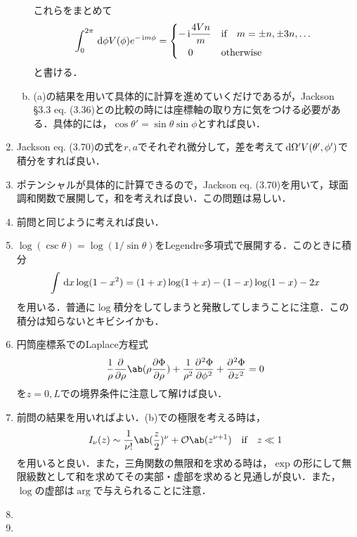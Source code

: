 \begin{enumerate}[label=\fbox{\textbf{\thesection.\arabic*}}]
\begin{enumerate}[(a)]
        これらをまとめて
        \begin{gather}
          \int_0^{2\pi} \dl{\phi} V(\phi) e^{-\i m \phi} = 
          \begin{dcases}
            - \i\frac{4Vn}{m} & \text{if}\qq m = \pm n, \pm 3n, \ldots\\
            \qq 0 &\text{otherwise}
          \end{dcases}
        \end{gather}
        と書ける．
      \item (a)の結果を用いて具体的に計算を進めていくだけであるが，Jackson §3.3 eq. (3.36)との比較の時には座標軸の取り方に気をつける必要がある．具体的には，$\cos\theta' = \sin\theta \sin \phi$とすれば良い．
    \end{enumerate}
  \item Jackson eq. (3.70)の式を$r, a$でそれぞれ微分して，差を考えて$\dl{\Omega'}V(\theta' , \phi')$で積分をすれば良い．
  \item ポテンシャルが具体的に計算できるので，Jackson eq. (3.70)を用いて，球面調和関数で展開して，和を考えれば良い．この問題は易しい．
  \item 前問と同じように考えれば良い．
  \item $\log(\csc\theta) = \log(1/\sin\theta)$をLegendre多項式で展開する．このときに積分
    \begin{gather}
      \int \dl{x} \log(1 - x^2) = (1+x)\log(1+x) - (1-x)\log(1-x) - 2x
    \end{gather}
    を用いる．普通に$\log$積分をしてしまうと発散してしまうことに注意．この積分は知らないとキビシイかも．
  \item 円筒座標系でのLaplace方程式
    \begin{gather}
      \frac{1}{\rho}\diffp**{\rho}{\ab(\rho \diffp{\Phi}{\rho})} + \frac{1}{\rho^2}\diffp[2]{\Phi}{\phi} + \diffp[2]{\Phi}{z} = 0
    \end{gather}
    を$z = 0, L$での境界条件に注意して解けば良い．
  \item 前問の結果を用いればよい．(b)での極限を考える時は，
    \begin{gather}
      I_\nu(z) \sim \frac{1}{\nu !} \ab(\frac{z}{2})^\nu + \order{z^{\nu+1}} \qq \text{if} \qq z \ll 1
    \end{gather}
    を用いると良い．また，三角関数の無限和を求める時は，$\exp$の形にして無限級数として和を求めてその実部・虚部を求めると見通しが良い．また，$\log$の虚部は$\arg$で与えられることに注意．
  \item %
  \item %

\end{enumerate}
